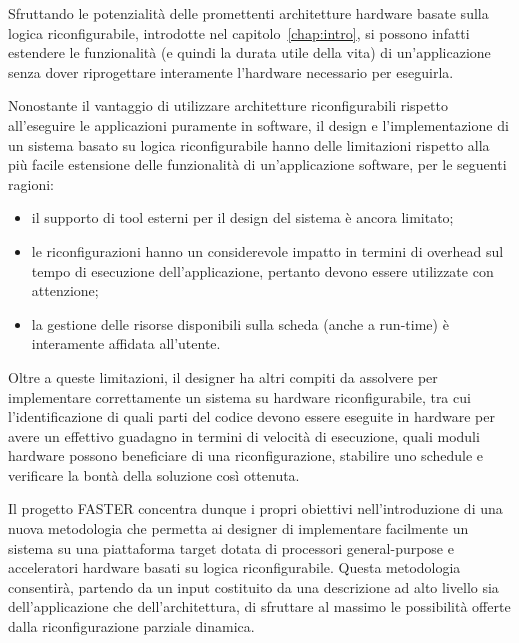Sfruttando le potenzialità delle promettenti architetture hardware basate sulla 
logica riconfigurabile, introdotte nel capitolo~\ref{chap:intro}, si possono 
infatti estendere le funzionalità (e quindi la durata utile della vita) di 
un'applicazione senza dover riprogettare interamente l'hardware necessario per 
eseguirla.

Nonostante il vantaggio di utilizzare architetture riconfigurabili rispetto 
all'eseguire le applicazioni puramente in software, il design e 
l'implementazione di un sistema basato su logica riconfigurabile hanno delle 
limitazioni rispetto alla più facile estensione delle funzionalità di 
un'applicazione software, per le seguenti ragioni:
\begin{itemize}
 \item il supporto di tool esterni per il design del sistema è ancora limitato;
 \item le riconfigurazioni hanno un considerevole impatto in termini di overhead sul 
tempo di esecuzione dell'applicazione, pertanto devono essere utilizzate con 
attenzione;
 \item la gestione delle risorse disponibili sulla scheda (anche a run-time) è 
interamente affidata all'utente.
\end{itemize}
Oltre a queste limitazioni, il designer ha altri compiti da assolvere per 
implementare correttamente un sistema su hardware riconfigurabile, tra cui 
l'identificazione di quali parti del codice devono essere eseguite in hardware 
per avere un effettivo guadagno in termini di velocità di esecuzione, quali 
moduli hardware possono beneficiare di una riconfigurazione, stabilire uno 
schedule e verificare la bontà della soluzione così ottenuta.

Il progetto \ac{FASTER} concentra dunque i propri obiettivi nell'introduzione 
di una nuova metodologia che permetta ai designer di implementare facilmente un 
sistema su una piattaforma target dotata di processori general-purpose e 
acceleratori hardware basati su logica riconfigurabile. Questa metodologia 
consentirà, partendo da un input costituito da una descrizione ad alto livello 
sia dell'applicazione che dell'architettura, di sfruttare al massimo le 
possibilità offerte dalla riconfigurazione parziale dinamica.


